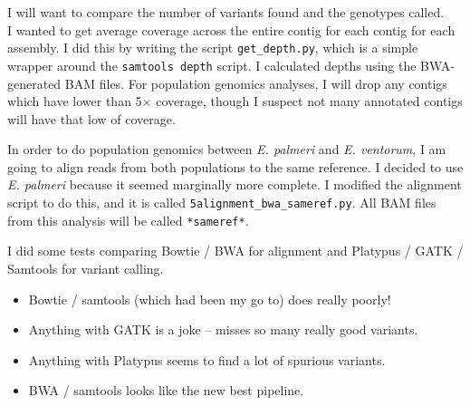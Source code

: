 \documentclass[idxtotoc,hyperref,openany,oneside]{labbook} %
\begin{document}
I will want to compare the number of variants found and the genotypes called. \\

I wanted to get average coverage across the entire contig for each contig for each assembly. I did this by writing the script \verb+get_depth.py+, which is a simple wrapper around the \verb+samtools depth+ script. I calculated depths using the BWA-generated BAM files. For population genomics analyses, I will drop any contigs which have lower than 5$\times$ coverage, though I suspect not many annotated contigs will have that low of coverage.

In order to do population genomics between \emph{E. palmeri} and \emph{E. ventorum}, I am going to align reads from both populations to the same reference. I decided to use \emph{E. palmeri} because it seemed marginally more complete. I modified the alignment script to do this, and it is called \verb+5alignment_bwa_sameref.py+. All BAM files from this analysis will be called \verb+*sameref*+.

I did some tests comparing Bowtie / BWA for alignment and Platypus / GATK / Samtools for variant calling.
\begin{itemize}
\item Bowtie / samtools (which had been my go to) does really poorly!
\item Anything with GATK is a joke -- misses so many really good variants.
\item Anything with Platypus seems to find a lot of spurious variants.
\item BWA / samtools looks like the new best pipeline. 
\end{itemize}
\end{document}
